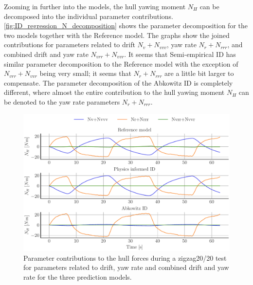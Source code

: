 Zooming in further into the models, the hull yawing moment $N_H$ can be decomposed into the individual parameter contributions. \autoref{fig:ID_regression_N_decomposition} shows the parameter decomposition for the two models together with the Reference model. The graphs show the joined contributions for parameters related to drift $N_v+N_{vvv}$, yaw rate $N_r+N_{rrr}$, and combined drift and yaw rate $N_{vrr}+N_{vvr}$. It seems that Semi-empirical ID has similar parameter decomposition to the Reference model with the exception of $N_{vrr}+N_{vvr}$ being very small; it seems that $N_r+N_{rrr}$ are a little bit larger to compensate.
The parameter decomposition of the Abkowitz ID is completely different, where almost the entire contribution to the hull yawing moment $N_H$ can be denoted to the yaw rate parameters $N_r+N_{rrr}$. 
\begin{figure}[h]
    \begin{center}
        \includegraphics[width=\columnwidth]{figures/result_ID_regression.ID_regression_N_decomposition.pdf}
        \caption{Parameter contributions to the hull forces during a zigzag20/20 test for parameters related to drift, yaw rate and combined drift and yaw rate for the three prediction models.}
        \label{fig:ID_regression_N_decomposition}
    \end{center}
\end{figure}


